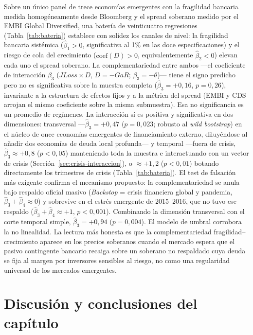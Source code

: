 Sobre un único panel de trece economías emergentes con la fragilidad bancaria medida homogéneamente desde Bloomberg y el spread soberano medido por el EMBI Global Diversified, una batería de veinticuatro regresiones (Tabla~\ref{tab:bateria}) establece con solidez los canales de nivel: la fragilidad bancaria sistémica ($\hat\beta_1>0$, significativa al 1\% en las doce especificaciones) y el riesgo de cola del crecimiento ($\text{coef}(D)>0$, equivalentemente $\hat\beta_2<0$) elevan cada uno el spread soberano. La complementariedad entre ambos —el coeficiente de interacción $\beta_3$ ($JLoss\times D$, $D=-GaR$; $\beta_3=-\theta$)— tiene el signo predicho pero no es significativa sobre la muestra completa ($\hat\beta_3=+0{,}16$, $p=0{,}26$), invariante a la estructura de efectos fijos y a la métrica del spread (EMBI y CDS arrojan el mismo coeficiente sobre la misma submuestra). Esa no significancia es un promedio de regímenes. La interacción sí es positiva y significativa en dos dimensiones: transversal —$\hat\beta_3=+0{,}47$ ($p=0{,}023$; robusto al \textit{wild bootstrap}) en el núcleo de once economías emergentes de financiamiento externo, diluyéndose al añadir dos economías de deuda local profunda— y temporal —fuera de crisis, $\hat\beta_3\approx+0{,}8$ ($p<0{,}05$) manteniendo toda la muestra e interactuando con un vector de crisis (Sección~\ref{sec:crisis-interaccion}), o $\approx+1{,}2$ ($p<0{,}01$) botando directamente los trimestres de crisis (Tabla~\ref{tab:bateria}). El test de falsación más exigente confirma el mecanismo propuesto: la complementariedad se anula bajo respaldo oficial masivo (\textit{Backstop} = crisis financiera global y pandemia, $\hat\beta_3+\hat\beta_4\approx0$) y sobrevive en el estrés emergente de 2015--2016, que no tuvo ese respaldo ($\hat\beta_3+\hat\beta_4\approx+1$, $p<0{,}001$). Combinando la dimensión transversal con el corte temporal simple, $\hat\beta_3=+0{,}94$ ($p=0{,}004$). El modelo de umbral corrobora la no linealidad. La lectura más honesta es que la complementariedad fragilidad--crecimiento aparece en los precios soberanos cuando el mercado espera que el pasivo contingente bancario recaiga sobre un soberano no respaldado cuya deuda se fija al margen por inversores sensibles al riesgo, no como una regularidad universal de los mercados emergentes.

\section{Discusión y conclusiones del capítulo}

